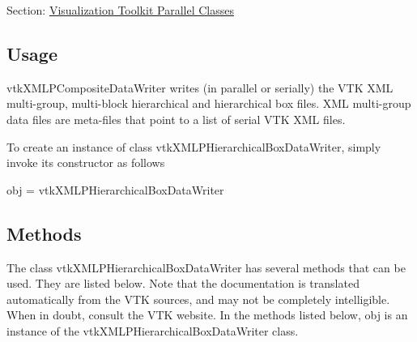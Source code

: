 Section\-: \hyperlink{sec_vtkparallel}{Visualization Toolkit Parallel Classes} \hypertarget{vtkwidgets_vtkxyplotwidget_Usage}{}\subsection{Usage}\label{vtkwidgets_vtkxyplotwidget_Usage}
vtk\-X\-M\-L\-P\-Composite\-Data\-Writer writes (in parallel or serially) the V\-T\-K X\-M\-L multi-\/group, multi-\/block hierarchical and hierarchical box files. X\-M\-L multi-\/group data files are meta-\/files that point to a list of serial V\-T\-K X\-M\-L files.

To create an instance of class vtk\-X\-M\-L\-P\-Hierarchical\-Box\-Data\-Writer, simply invoke its constructor as follows \begin{DoxyVerb}  obj = vtkXMLPHierarchicalBoxDataWriter
\end{DoxyVerb}
 \hypertarget{vtkwidgets_vtkxyplotwidget_Methods}{}\subsection{Methods}\label{vtkwidgets_vtkxyplotwidget_Methods}
The class vtk\-X\-M\-L\-P\-Hierarchical\-Box\-Data\-Writer has several methods that can be used. They are listed below. Note that the documentation is translated automatically from the V\-T\-K sources, and may not be completely intelligible. When in doubt, consult the V\-T\-K website. In the methods listed below, {\ttfamily obj} is an instance of the vtk\-X\-M\-L\-P\-Hierarchical\-Box\-Data\-Writer class. 
